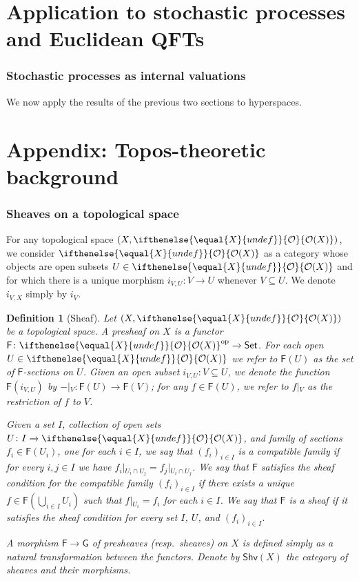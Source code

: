 \documentclass[reqno,11pt]{amsproc}
\theoremstyle{plain}
\newtheorem{definition}[theorem]{Definition}
\theoremstyle{definition}
\newcommand{\cat}[1]{\mathsf{#1}}
\newcommand{\fun}[1]{\mathsf{#1}}
\newcommand{\sheaf}[1]{\fun{#1}}
\newcommand{\op}{^\mathrm{op}}
\newcommand{\Set}{\cat{Set}}
\renewcommand{\to}[1][]{\xrightarrow{#1}}
\newcommand{\shv}{\cat{Shv}}
\newcommand{\Op}[1][undef]{\ifthenelse{\equal{#1}{undef}}{\mathcal{O}}{\mathcal{O}(#1)}}
\newcommand{\rest}[2]{#1\big|\hspace{0in}_{#2}}
\numberwithin{equation}{section}
\begin{document}
\newpage
\part{Application to stochastic processes and Euclidean QFTs}

\section{Stochastic processes as internal valuations}

We now apply the results of the previous two sections to hyperspaces.


\appendix

\part{Appendix: Topos-theoretic background}\label{sec.topos_background}

\section{Sheaves on a topological space}

For any topological space $(X,\Op[X])$, we consider $\Op[X]$ as a category whose objects are open subsets $U\in\Op[X]$ and for which there is a unique morphism $i_{V,U}\colon V\to U$ whenever $V\subseteq U$. We denote $i_{V,X}$ simply by $i_V$.

\begin{definition}[Sheaf]\label{def.sheaf}
Let $(X,\Op[X])$ be a topological space. A \emph{presheaf} on $X$ is a functor $\sheaf{F}\colon\Op[X]\op\to\Set$. For each open $U\in\Op[X]$ we refer to $\sheaf{F}(U)$ as the set of \emph{$\sheaf{F}$-sections on $U$}. Given an open subset $i_{V,U}\colon V\subseteq U$, we denote the function $\sheaf{F}(i_{V,U})$ by $\rest{-}{V}\colon\sheaf{F}(U)\to\sheaf{F}(V)$; for any $f\in\sheaf{F}(U)$, we refer to $\rest{f}{V}$ as the \emph{restriction of $f$ to $V$}.

Given a set $I$, collection of open sets $U\colon I\to\Op[X]$, and family of sections $f_i\in\sheaf{F}(U_i)$, one for each $i\in I$, we say that $(f_i)_{i\in I}$ is a \emph{compatible family} if for every $i,j\in I$ we have $\rest{f_i}{U_i\cap U_j}=\rest{f_j}{U_i\cap U_j}$. We say that $\sheaf{F}$ satisfies the \emph{sheaf condition} for the compatible family $(f_i)_{i\in I}$ if there exists a unique $f\in \sheaf{F}(\bigcup_{i\in I}U_i)$ such that $\rest{f}{U_i}=f_i$ for each $i\in I$. We say that $\sheaf{F}$ is a \emph{sheaf} if it satisfies the sheaf condition for every set $I$, $U$, and $(f_i)_{i\in I}$.

A \emph{morphism $\sheaf{F}\to\sheaf{G}$ of presheaves (resp.\ sheaves) on $X$} is defined simply as a natural transformation between the functors. Denote by $\shv(X)$ the category of sheaves and their morphisms.
\end{definition}
\end{document}
